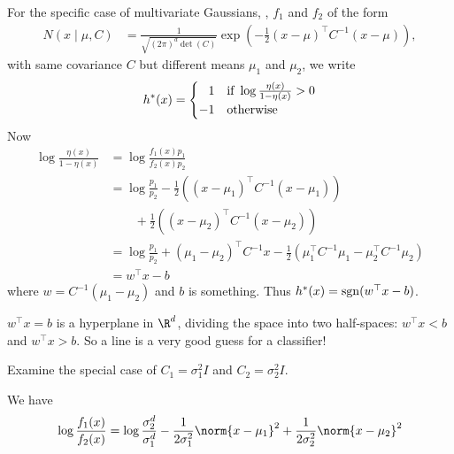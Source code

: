 For the specific case of multivariate Gaussians, \ie, $f_1$ and $f_2$ of the
form \begin{align*}
    N(x \mid \mu, C) &= \frac{1}{\sqrt{(2\pi)^d \det(C)}}
        \exp\left(-\frac{1}{2}(x - \mu)^\top C^{-1} (x - \mu)\right),
\end{align*} with same covariance $C$ but different means $\mu_1$ and $\mu_2$,
we write \[
    h^*(x) = \begin{cases}
        \hphantom{-}1 & \text{if } \log \frac{\eta(x)}{1 - \eta(x)} > 0 \\
        -1 & \text{otherwise}
    \end{cases}
\] Now \begin{align*}
    \log \frac{\eta(x)}{1 - \eta(x)}
        &= \log \frac{f_1(x) p_1}{f_2(x) p_2} \\
        &= \log \frac{p_1}{p_2} - \frac12 \left((x-\mu_1)^\top C^{-1}(x-\mu_1)\right) \\
        &\qquad + \frac12 \left((x-\mu_2)^\top C^{-1}(x-\mu_2)\right) \\
        &= \log \frac{p_1}{p_2} + (\mu_1 - \mu_2)^\top C^{-1} x
            - \frac12 (\mu_1^\top C^{-1} \mu_1 - \mu_2^\top C^{-1} \mu_2) \\
        &= w^\top x - b
\end{align*} where $w = C^{-1}(\mu_1 - \mu_2)$ and $b$ is something.
Thus $h^*(x) = \operatorname{sgn}(w^\top x - b)$.
\begin{remark}
    $w^\top x = b$ is a hyperplane in $\R^d$, dividing the space into two
    half-spaces: $w^\top x < b$ and $w^\top x > b$.
    So a line is a very good guess for a classifier!
\end{remark}

\begin{exercise}
    Examine the special case of $C_1 = \sigma_1^2 I$ and
    $C_2 = \sigma_2^2 I$.
\end{exercise}
\begin{solution}
    We have \begin{equation*}
        \log \frac{f_1(x)}{f_2(x)}
            = \log \frac{\sigma_2^d}{\sigma_1^d}
                - \frac{1}{2\sigma_1^2} \norm{x - \mu_1}^2
                + \frac{1}{2\sigma_2^2} \norm{x - \mu_2}^2
    \end{equation*}
\end{solution}

